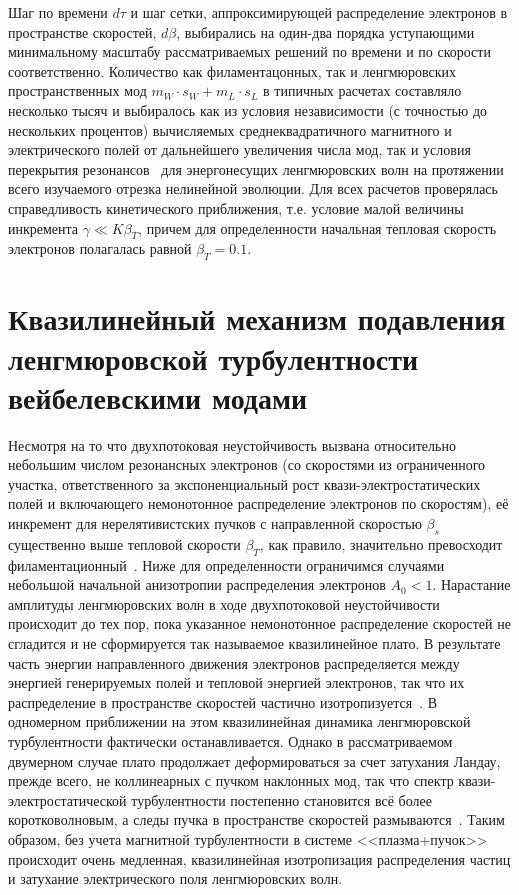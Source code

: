 Шаг по времени $d\tau$ и шаг сетки, аппроксимирующей распределение электронов в пространстве скоростей, $d\beta$, выбирались на один-два порядка уступающими минимальному масштабу рассматриваемых решений по времени и по скорости соответственно. Количество как филаментацонных, так и ленгмюровских пространственных мод $m_W\cdot s_W+m_L\cdot s_L$ в типичных расчетах составляло несколько тысяч и выбиралось как из условия независимости (с точностью до нескольких процентов) вычисляемых среднеквадратичного магнитного и электрического полей от дальнейшего увеличения числа мод, так и условия перекрытия резонансов~\cite{GaleevSagdeev1969,VedenovRyutov1975,Bakunin2017} для энергонесущих ленгмюровских волн на протяжении всего изучаемого отрезка нелинейной эволюции. Для всех расчетов проверялась справедливость кинетического приближения, т.е. условие малой величины инкремента $\gamma\ll K\beta_T$, причем для определенности начальная тепловая скорость электронов полагалась равной $\beta_{T}=0.1$. 

\section{Квазилинейный механизм подавления ленгмюровской турбулентности вейбелевскими модами}\label{sec:ch3/sec3}

Несмотря на то что двухпотоковая неустойчивость вызвана относительно небольшим числом резонансных электронов (со скоростями из ограниченного участка, ответственного за экспоненциальный рост квази-электростатических полей и включающего  немонотонное распределение электронов по скоростям), её инкремент для нерелятивистских пучков с направленной скоростью $\beta_s$ существенно выше тепловой скорости $\beta_{T}$, как правило, значительно превосходит филаментационный~\cite{Bret2010,Karlick2008,Kong2009}. Ниже для определенности ограничимся случаями небольшой начальной анизотропии распределения электронов $A_0 < 1$. Нарастание амплитуды ленгмюровских волн в ходе двухпотоковой неустойчивости происходит до тех пор, пока указанное немонотонное распределение скоростей не сгладится и не сформируется так называемое квазилинейное плато. В результате часть энергии направленного движения электронов распределяется между энергией генерируемых полей и тепловой энергией электронов, так что их распределение в пространстве скоростей частично изотропизуется~\cite{GaleevSagdeev1969,VedenovRyutov1975,Bakunin2017,Ouyang2026}. В одномерном приближении на этом квазилинейная динамика ленгмюровской турбулентности фактически останавливается. Однако в рассматриваемом двумерном случае плато продолжает деформироваться за счет затухания Ландау, прежде всего, не коллинеарных с пучком наклонных мод, так что спектр квази-электростатической турбулентности постепенно становится всё более коротковолновым, а следы пучка в пространстве скоростей размываются~\cite{Ivanov1975,Appert1976,Yi2010}. Таким образом, без учета магнитной турбулентности в системе <<плазма+пучок>> происходит очень медленная, квазилинейная изотропизация распределения частиц и затухание электрического поля ленгмюровских волн. 

